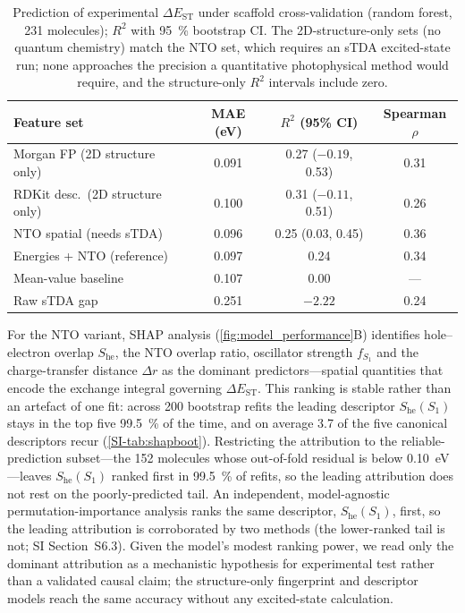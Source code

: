 \begin{table}[htbp]
  \centering
  \caption{Prediction of experimental $\Delta E_\text{ST}$ under scaffold
    cross-validation (random forest, \num{231} molecules); $R^2$ with \qty{95}{\percent}
    bootstrap CI. The 2D-structure-only sets (no quantum chemistry) match the
    NTO set, which requires an sTDA excited-state run; none approaches the
    precision a quantitative photophysical method would require, and the
    structure-only $R^2$ intervals include zero.}
  \label{tab:feature_comparison}
  \begin{tabular}{lccc}
    \toprule
    Feature set & MAE (eV) & $R^2$ (95\% CI) & Spearman $\rho$ \\
    \midrule
    Morgan FP (2D structure only)   & 0.091 & 0.27 ($-0.19$, 0.53) & 0.31 \\
    RDKit desc.\ (2D structure only) & 0.100 & 0.31 ($-0.11$, 0.51) & 0.26 \\
    NTO spatial (needs sTDA)        & 0.096 & 0.25 (0.03, 0.45) & 0.36 \\
    Energies + NTO (reference)      & 0.097 & 0.24 & 0.34 \\
    \midrule
    Mean-value baseline             & 0.107 & 0.00 & --- \\
    Raw sTDA gap                    & 0.251 & $-2.22$ & 0.24 \\
    \bottomrule
  \end{tabular}
\end{table}

For the NTO variant, SHAP analysis (\cref{fig:model_performance}B) identifies
hole--electron overlap $S_\text{he}$, the NTO overlap ratio, oscillator strength
$f_{S_1}$ and the charge-transfer distance $\Delta r$ as the dominant
predictors---spatial quantities that encode the exchange integral governing
$\Delta E_\text{ST}$. This ranking is stable rather than an artefact of one fit:
across \num{200} bootstrap refits the leading descriptor $S_\text{he}(S_1)$ stays
in the top five \qty{99.5}{\percent} of the time, and on average \num{3.7} of the
five canonical descriptors recur (\cref{SI-tab:shapboot}). Restricting the attribution to
the reliable-prediction subset---the \num{152} molecules whose out-of-fold residual is
below \qty{0.10}{\electronvolt}---leaves $S_\text{he}(S_1)$ ranked first in
\qty{99.5}{\percent} of refits, so the leading attribution does not rest on the
poorly-predicted tail. An independent, model-agnostic permutation-importance analysis ranks the same
descriptor, $S_\text{he}(S_1)$, first, so the leading attribution is corroborated by
two methods (the lower-ranked tail is not; SI Section~S6.3). Given the model's modest
ranking power, we read only the dominant attribution as a mechanistic hypothesis for
experimental test rather than a validated causal claim; the structure-only
fingerprint and descriptor models reach the same accuracy without any excited-state
calculation.

